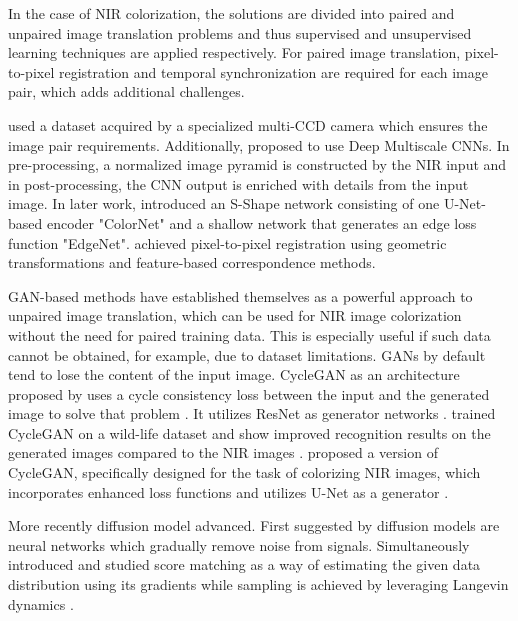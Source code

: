 In the case of NIR colorization, the solutions are divided into paired and unpaired image translation problems and thus supervised and unsupervised learning techniques are applied respectively.
For paired image translation, pixel-to-pixel registration and temporal synchronization are required for each image pair, which adds additional challenges.

\textcite{limmer} used a dataset acquired by a specialized multi-CCD camera which ensures the image pair requirements.
Additionally, \textcite{limmer} proposed to use Deep Multiscale CNNs.
In pre-processing, a normalized image pyramid is constructed by the NIR input and in post-processing, the CNN output is enriched with details from the input image.
In later work, \textcite{s-shape} introduced an S-Shape network consisting of one U-Net-based encoder "ColorNet" and a shallow network that generates an edge loss function "EdgeNet".
\textcite{s-shape} achieved pixel-to-pixel registration using geometric transformations and feature-based correspondence methods.

GAN-based methods have established themselves as a powerful approach to unpaired image translation, which can be used for NIR image colorization without the need for paired training data.
This is especially useful if such data cannot be obtained, for example, due to dataset limitations.
GANs by default tend to lose the content of the input image. CycleGAN as an architecture proposed by  uses a cycle consistency loss between the input and the generated image to solve that problem \cite{cyclegan-original}.
It utilizes ResNet \parencite{resnet} as generator networks \parencite{cyclegan-original}.
 trained CycleGAN on a wild-life dataset and show improved recognition results on the generated images compared to the NIR images \parencite{cyclegan-camera-traps}.
 proposed a version of CycleGAN, specifically designed for the task of colorizing NIR images, which incorporates enhanced loss functions and utilizes U-Net as a generator \parencite{mehri}.

More recently diffusion model advanced. 
First suggested by \textcite{deep-unsupervised-learning-using-nonequilibrium-thermodynamics} diffusion models are neural networks which gradually remove noise from signals. 
Simultaneously \textcite{generative-modeling-by-estimating-gradients-of-the-data-distribution} introduced and studied score matching as a way of estimating the given data distribution using its gradients while sampling is achieved by leveraging Langevin dynamics \parencite{langevin-dynamics}.

